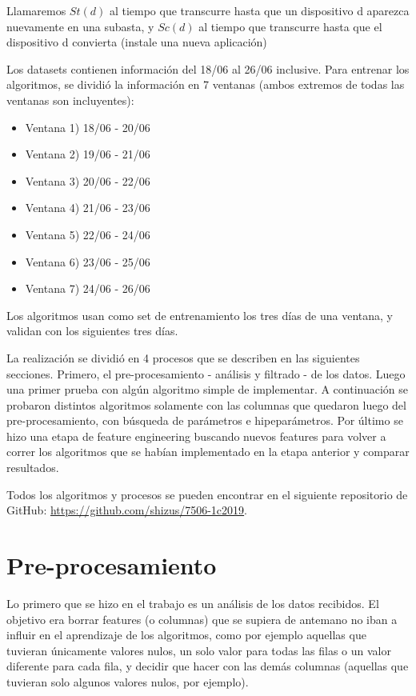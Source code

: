 \documentclass[a4paper, 12pt]{article}
\begin{document}
Llamaremos $St(d)$ al tiempo que transcurre hasta que un dispositivo d aparezca nuevamente en una subasta, y $Sc(d)$ al tiempo que transcurre hasta que el dispositivo d convierta (instale una nueva aplicación)


Los datasets contienen información del 18/06 al 26/06 inclusive.
Para entrenar los algoritmos, se dividió la información en 7 ventanas (ambos extremos de todas las ventanas son incluyentes):

\begin{itemize}
    \item Ventana 1) 18/06 - 20/06 \item Ventana 2) 19/06 - 21/06
    \item Ventana 3) 20/06 - 22/06 \item Ventana 4) 21/06 - 23/06
    \item Ventana 5) 22/06 - 24/06 \item Ventana 6) 23/06 - 25/06
    \item Ventana 7) 24/06 - 26/06
\end{itemize}

Los algoritmos usan como set de entrenamiento los tres días de una ventana, y validan con los siguientes tres días.

La realización se dividió en 4 procesos que se describen en las siguientes secciones.
Primero, el pre-procesamiento - análisis y filtrado - de los datos. Luego una primer prueba con algún algoritmo simple de implementar. A continuación se probaron distintos algoritmos solamente con las columnas que quedaron luego del pre-procesamiento, con búsqueda de parámetros e hipeparámetros. Por último se hizo una etapa de feature engineering buscando nuevos features para volver a correr los algoritmos que se habían implementado en la etapa anterior y comparar resultados.

Todos los algoritmos y procesos se pueden encontrar en el siguiente repositorio de GitHub: \href{https://github.com/shizus/7506-1c2019}{https://github.com/shizus/7506-1c2019}.

\newpage
\section{Pre-procesamiento}
Lo primero que se hizo en el trabajo es un análisis de los datos recibidos. El objetivo era borrar features (o columnas) que se supiera de antemano no iban a influir en el aprendizaje de los algoritmos, como por ejemplo aquellas que tuvieran únicamente valores nulos, un solo valor para todas las filas o un valor diferente para cada fila, y decidir que hacer con las demás columnas (aquellas que tuvieran solo algunos valores nulos, por ejemplo).
\end{document}
